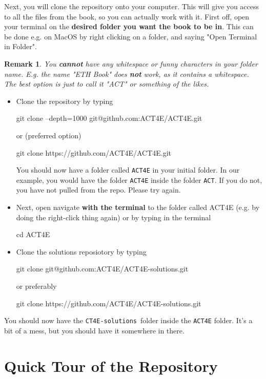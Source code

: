 \documentclass{article}
\newtheorem{remark}{Remark}
\begin{document}

Next, you will clone the repository onto your computer. This will give you access to all the files from the book, so you can actually work with it. First off, open your terminal on the \textbf{desired folder you want the book to be in}. This can be done e.g. on MacOS by right clicking on a folder, and saying "Open Terminal in Folder". 

\begin{remark}
    You \textbf{cannot} have any whitespace or funny characters in your folder name. E.g. the name "ETH Book" does \textbf{not} work, as it contains a whitespace. The best option is just to call it "ACT" or something of the likes.
\end{remark}
\begin{itemize}
    \item Clone the repository by typing
\begin{bashcode}
  git clone --depth=1000 git@github.com:ACT4E/ACT4E.git
\end{bashcode}
or (preferred option)
\begin{bashcode}
  git clone https://github.com/ACT4E/ACT4E.git
\end{bashcode}
You should now have a folder called \texttt{ACT4E} in your initial folder. In our example, you would have the folder \texttt{ACT4E} inside the folder \texttt{ACT}. If you do not, you have not pulled from the repo. Please try again.
\item Next, open navigate \textbf{with the terminal} to the folder called ACT4E (e.g. by doing the right-click thing again) or by typing in the terminal
\begin{bashcode}
  cd ACT4E
\end{bashcode}
\item Clone the solutions reposiotory by typing
\begin{bashcode}
 git clone git@github.com:ACT4E/ACT4E-solutions.git
\end{bashcode}
or preferably
\begin{bashcode}
  git clone https://github.com/ACT4E/ACT4E-solutions.git
\end{bashcode}
\end{itemize}
You should now have the \texttt{CT4E-solutions} folder inside the \texttt{ACT4E} folder. It's a bit of a mess, but you should have it somewhere in there.

\section{Quick Tour of the Repository}
\end{document}
